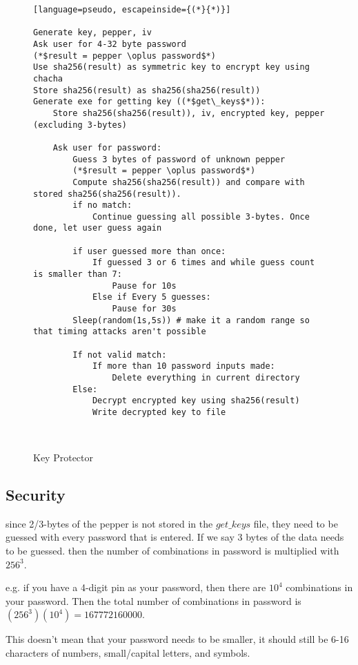 \documentclass[a4paper,12pt]{article}
\begin{document}
\begin{figure}[htb]
\begin{small}
\begin{lstlisting}[language=pseudo, escapeinside={(*}{*)}]

Generate key, pepper, iv
Ask user for 4-32 byte password
(*$result = pepper \oplus password$*)
Use sha256(result) as symmetric key to encrypt key using chacha
Store sha256(result) as sha256(sha256(result))
Generate exe for getting key ((*$get\_keys$*)):
	Store sha256(sha256(result)), iv, encrypted key, pepper (excluding 3-bytes)

	Ask user for password:
		Guess 3 bytes of password of unknown pepper
		(*$result = pepper \oplus password$*)
		Compute sha256(sha256(result)) and compare with stored sha256(sha256(result)).
		if no match:
			Continue guessing all possible 3-bytes. Once done, let user guess again

		if user guessed more than once:
			If guessed 3 or 6 times and while guess count is smaller than 7:
				Pause for 10s
			Else if Every 5 guesses:
				Pause for 30s
		Sleep(random(1s,5s)) # make it a random range so that timing attacks aren't possible

		If not valid match:
			If more than 10 password inputs made:
				Delete everything in current directory
		Else:
			Decrypt encrypted key using sha256(result)
			Write decrypted key to file

			

\end{lstlisting}
\end{small}
\caption{Key Protector}\label{key_protector}
\end{figure}


\subsection{Security}

since 2/3-bytes of the pepper is not stored in the $get\_keys$ file, they need to be guessed with every password that is entered. If we say 3 bytes of the data needs to be guessed. then the number of combinations in password is multiplied with $256^3$.

e.g. if you have a 4-digit pin as your password, then there are $10^4$ combinations in your password. Then the total number of combinations in password is $(256^3)(10^4) = 167772160000$.

This doesn't mean that your password needs to be smaller, it should still be 6-16 characters of numbers, small/capital letters, and symbols.
\end{document}
